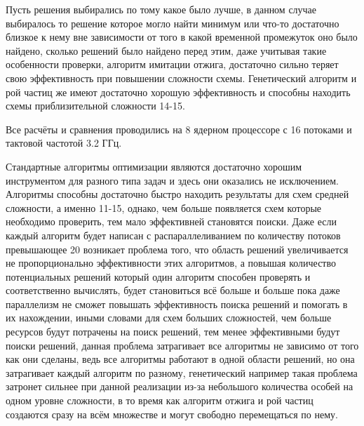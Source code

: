 \documentclass[14pt]{extarticle} %
\begin{document}
Пусть решения выбирались по тому какое было лучше, в данном случае выбиралось то решение которое могло найти минимум или что-то достаточно близкое к нему вне зависимости от того в какой временной промежуток оно было найдено, сколько решений было найдено перед этим, даже учитывая такие особенности проверки, алгоритм имитации отжига, достаточно сильно теряет свою эффективность при повышении сложности схемы. Генетический алгоритм и рой частиц же имеют достаточно хорошую эффективность и способны находить схемы приблизительной сложности 14-15.




Все расчёты и сравнения проводились на 8 ядерном процессоре с 16 потоками и тактовой частотой 3.2 ГГц.


Стандартные алгоритмы оптимизации являются достаточно хорошим инструментом для разного типа задач и здесь они оказались не исключением. Алгоритмы способны достаточно быстро находить результаты для схем средней сложности, а именно 11-15, однако, чем больше появляется схем которые необходимо проверить, тем мало эффективней становятся поиски. Даже если каждый алгоритм будет написан с распараллеливанием по  количеству потоков превышающее 20 возникает проблема того, что область решений увеличивается не пропорционально эффективности этих алгоритмов, а повышая количество потенциальных решений который один алгоритм способен проверять и соответственно вычислять, будет становиться всё больше и больше пока даже параллелизм не сможет повышать эффективность поиска решений и помогать в их нахождении, иными словами для схем больших сложностей, чем больше ресурсов будут потрачены на поиск решений, тем менее эффективными будут поиски решений, данная проблема затрагивает все алгоритмы не зависимо от того как они сделаны, ведь все алгоритмы работают в одной области решений, но она затрагивает каждый алгоритм по разному, генетический например такая проблема затронет сильнее при данной реализации из-за небольшого количества особей на одном уровне сложности, в то время как алгоритм отжига и рой частиц создаются сразу на всём множестве и могут свободно перемещаться по нему.
\end{document}
